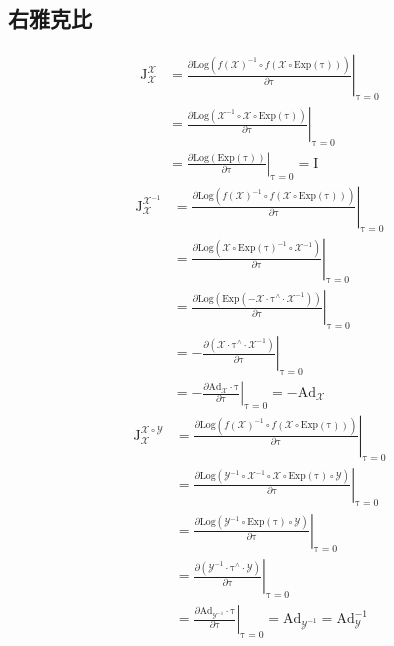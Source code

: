 \documentclass[12pt, onecolumn]{article}
\newcommand\normf{\fangsong}
\newcommand\liehat[1]{#1^{\land}}
\newcommand\Exp[1]{\mathrm{Exp}\left( #1\right) }
\newcommand\Log[1]{\mathrm{Log}\left( #1\right) }
\newcommand\bsm[1]{\boldsymbol{\mathrm{#1}}}
\begin{document}
	\subsection{\normf 右雅克比}
	\vspace{5mm}
	\begin{equation}
	\begin{aligned}
	\bsm{J}_{\mathcal{X}}^{\mathcal{X}}&=
	\left. \frac{\partial \Log{f(\mathcal{X})^{-1}\circ f(\mathcal{X}\circ\Exp{\bsm\tau})}}{\partial \bsm{\tau}}\right|_{\bsm{\tau}=0}
	\\&=\left. \frac{\partial \Log{\mathcal{X}^{-1}\circ \mathcal{X}\circ\Exp{\bsm\tau}}}{\partial \bsm{\tau}}\right|_{\bsm{\tau}=0}
	\\&=\left. \frac{\partial \Log{\Exp{\bsm\tau}}}{\partial \bsm{\tau}}\right|_{\bsm{\tau}=0}=\bsm{I}
	\end{aligned}
	\end{equation}
	\vspace{5mm}
	\begin{equation}
	\begin{aligned}
	\bsm{J}_{\mathcal{X}}^{\mathcal{X}^{-1}}&=
	\left. \frac{\partial \Log{f(\mathcal{X})^{-1}\circ f(\mathcal{X}\circ\Exp{\bsm\tau})}}{\partial \bsm{\tau}}\right|_{\bsm{\tau}=0}
	\\&=\left. \frac{
	\partial \Log{\mathcal{X}\circ\Exp{\bsm\tau}^{-1}\circ\mathcal{X}^{-1}}
	}{\partial \bsm{\tau}}\right|_{\bsm{\tau}=0}
	\\&=\left. \frac{
		\partial \Log{\Exp{-\mathcal{X}\cdot\liehat{\bsm\tau}\cdot\mathcal{X}^{-1}}}
		}{\partial \bsm{\tau}}\right|_{\bsm{\tau}=0}
	\\&=-\left. \frac{
		\partial \left( \mathcal{X}\cdot\liehat{\bsm\tau}\cdot\mathcal{X}^{-1}\right) 
		}{\partial \bsm{\tau}}\right|_{\bsm{\tau}=0}
	\\&=-\left. \frac{
		\partial \bsm{Ad}_{\mathcal{X}}\cdot\bsm{\tau} 
		}{\partial \bsm{\tau}}\right|_{\bsm{\tau}=0}=-\bsm{Ad}_{\mathcal{X}}
	\end{aligned}
	\end{equation}
	\vspace{5mm}
	\begin{equation}
	\begin{aligned}
	\bsm{J}_{\mathcal{X}}^{\mathcal{X}\circ\mathcal{Y}}&=
	\left. \frac{\partial \Log{f(\mathcal{X})^{-1}\circ f(\mathcal{X}\circ\Exp{\bsm\tau})}}{\partial \bsm{\tau}}\right|_{\bsm{\tau}=0}
	\\&=\left. \frac{\partial \Log{\mathcal{Y}^{-1}\circ\mathcal{X}^{-1}\circ \mathcal{X}\circ\Exp{\bsm\tau}\circ\mathcal{Y}}}{\partial \bsm{\tau}}\right|_{\bsm{\tau}=0}
	\\&=\left. \frac{\partial \Log{\mathcal{Y}^{-1}\circ\Exp{\bsm\tau}\circ\mathcal{Y}}}{\partial \bsm{\tau}}\right|_{\bsm{\tau}=0}
	\\&=\left. \frac{\partial \left( \mathcal{Y}^{-1}\cdot\liehat{\bsm{\tau}}\cdot\mathcal{Y}\right) }{\partial \bsm{\tau}}\right|_{\bsm{\tau}=0}
	\\&=\left. \frac{\partial \bsm{Ad}_{\mathcal{Y}^{-1}}\cdot\bsm{\tau} }{\partial \bsm{\tau}}\right|_{\bsm{\tau}=0}=\bsm{Ad}_{\mathcal{Y}^{-1}}=\bsm{Ad}_{\mathcal{Y}}^{-1}
	\end{aligned}
	\end{equation}
\end{document}
